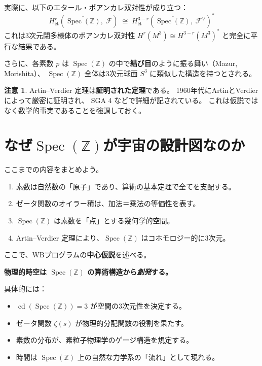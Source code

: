 \documentclass[11pt,a4paper]{article}
\theoremstyle{definition}
\newtheorem{rmk}[thm]{注意}
\newcommand{\Z}{\mathbb{Z}}
\newcommand{\Spec}{\operatorname{Spec}}
\newcommand{\cd}{\operatorname{cd}}
\begin{document}
実際に、以下のエタール・ポアンカレ双対性が成り立つ：
\[
  H^r_{\text{\'et}}(\overline{\Spec(\Z)},\; \mathcal{F})
  \;\cong\;
  H^{3-r}_{\text{\'et}}(\overline{\Spec(\Z)},\; \mathcal{F}^{\vee})^*
\]
これは3次元閉多様体のポアンカレ双対性
$H^r(M^3) \cong H^{3-r}(M^3)^*$ と完全に平行な結果である。

さらに、各素数 $p$ は $\Spec(\Z)$ の中で\textbf{結び目}のように振る舞い（Mazur, Morishita）、
$\Spec(\Z)$ 全体は3次元球面 $S^3$ に類似した構造を持つとされる。

\begin{rmk}
Artin--Verdier 定理は\textbf{証明された定理}である。
1960年代にArtinとVerdierによって厳密に証明され、
SGA 4 などで詳細が記されている。
これは仮説ではなく数学的事実であることを強調しておく。
\end{rmk}

\section{なぜ$\Spec(\Z)$が宇宙の設計図なのか}
\label{sec:1.5}

ここまでの内容をまとめよう。
\begin{enumerate}
  \item 素数は自然数の「原子」であり、算術の基本定理で全てを支配する。
  \item ゼータ関数のオイラー積は、加法＝乗法の等価性を表す。
  \item $\Spec(\Z)$ は素数を「点」とする幾何学的空間。
  \item Artin--Verdier 定理により、$\Spec(\Z)$ はコホモロジー的に3次元。
\end{enumerate}

ここで、WBプログラムの\textbf{中心仮説}を述べる。

\begin{hypbox}
\textbf{物理的時空は $\Spec(\Z)$ の算術構造から\emph{創発}する。}

具体的には：
\begin{itemize}
  \item $\cd(\Spec(\Z)) = 3$ が空間の3次元性を決定する。
  \item ゼータ関数 $\zeta(s)$ が物理的分配関数の役割を果たす。
  \item 素数の分布が、素粒子物理学のゲージ構造を規定する。
  \item 時間は $\Spec(\Z)$ 上の自然な力学系の「流れ」として現れる。
\end{itemize}
\end{hypbox}
\end{document}
